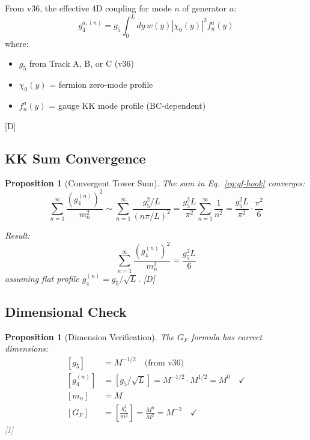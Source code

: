 \documentclass[11pt,a4paper]{article}
\newtheorem{proposition}[theorem]{Proposition}
\newcommand{\tagD}{\textcolor{blue!70!black}{[D]}}
\newcommand{\tagI}{\textcolor{gray}{[I]}}
\begin{document}
From v36, the effective 4D coupling for mode $n$ of generator $a$:
\begin{equation}
\label{eq:g4-overlap}
g_4^{a,(n)} = g_5 \int_0^L dy\, w(y) |\chi_0(y)|^2 f_n^a(y)
\end{equation}
where:
\begin{itemize}
    \item $g_5$ from Track A, B, or C (v36)
    \item $\chi_0(y)$ = fermion zero-mode profile
    \item $f_n^a(y)$ = gauge KK mode profile (BC-dependent)
\end{itemize}

\tagD

\subsection{KK Sum Convergence}

\begin{proposition}[Convergent Tower Sum]
\label{prop:convergent}
The sum in Eq.~\eqref{eq:gf-hook} converges:
\begin{equation}
\label{eq:gf-sum-conv}
\sum_{n=1}^\infty \frac{(g_4^{(n)})^2}{m_n^2} \sim \sum_{n=1}^\infty \frac{g_5^2/L}{(n\pi/L)^2}
= \frac{g_5^2 L}{\pi^2} \sum_{n=1}^\infty \frac{1}{n^2} = \frac{g_5^2 L}{\pi^2} \cdot \frac{\pi^2}{6}
\end{equation}

Result:
\begin{equation}
\label{eq:gf-sum-result}
\sum_{n=1}^\infty \frac{(g_4^{(n)})^2}{m_n^2} = \frac{g_5^2 L}{6}
\end{equation}
assuming flat profile $g_4^{(n)} = g_5/\sqrt{L}$. \tagD
\end{proposition}

\subsection{Dimensional Check}

\begin{proposition}[Dimension Verification]
\label{prop:dim-check}
The $G_F$ formula has correct dimensions:
\begin{align}
\label{eq:dim-g5}
[g_5] &= M^{-1/2} \quad \text{(from v36)} \\
\label{eq:dim-g4}
[g_4^{(n)}] &= [g_5/\sqrt{L}] = M^{-1/2} \cdot M^{1/2} = M^0 \quad \checkmark \\
\label{eq:dim-m}
[m_n] &= M \\
\label{eq:dim-GF}
[G_F] &= \left[\frac{g_4^2}{m^2}\right] = \frac{M^0}{M^2} = M^{-2} \quad \checkmark
\end{align}
\tagI
\end{proposition}
\end{document}
